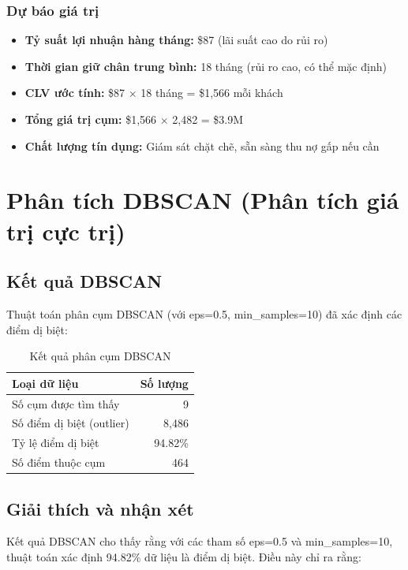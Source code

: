 \subsubsection{Dự báo giá trị}

\begin{itemize}
    \item \textbf{Tỷ suất lợi nhuận hàng tháng:} \$87 (lãi suất cao do rủi ro)
    \item \textbf{Thời gian giữ chân trung bình:} 18 tháng (rủi ro cao, có thể mặc định)
    \item \textbf{CLV ước tính:} \$87 × 18 tháng = \$1,566 mỗi khách
    \item \textbf{Tổng giá trị cụm:} \$1,566 × 2,482 = \$3.9M
    \item \textbf{Chất lượng tín dụng:} Giám sát chặt chẽ, sẵn sàng thu nợ gấp nếu cần
\end{itemize}

\section{Phân tích DBSCAN (Phân tích giá trị cực trị)}

\subsection{Kết quả DBSCAN}

Thuật toán phân cụm DBSCAN (với eps=0.5, min\_samples=10) đã xác định các điểm dị biệt:

\begin{table}[H]
\centering
\caption{Kết quả phân cụm DBSCAN}
\begin{tabular}{|l|r|}
\hline
\textbf{Loại dữ liệu} & \textbf{Số lượng} \\
\hline
Số cụm được tìm thấy & 9 \\
\hline
Số điểm dị biệt (outlier) & 8,486 \\
\hline
Tỷ lệ điểm dị biệt & 94.82\% \\
\hline
Số điểm thuộc cụm & 464 \\
\hline
\end{tabular}
\end{table}

\subsection{Giải thích và nhận xét}

Kết quả DBSCAN cho thấy rằng với các tham số eps=0.5 và min\_samples=10, thuật toán xác định 94.82\% dữ liệu là điểm dị biệt. Điều này chỉ ra rằng:

